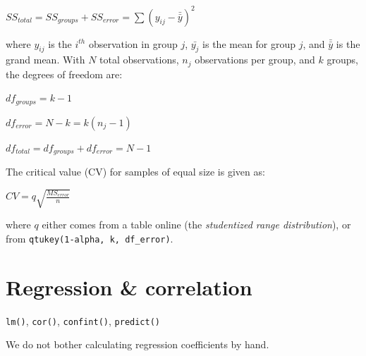 \documentclass[
  11pt,
  a4paper,
]{book}
\begin{document}
\({SS}_{total} = {SS}_{groups} + {SS}_{error} = \sum{(y_{ij} - \bar{\bar{y}})^2}\)

where \(y_{ij}\) is the \(i^{th}\) observation in group \(j\), \(\bar{y_j}\) is the mean for group \(j\), and \(\bar{\bar{y}}\) is the grand mean. With \(N\) total observations, \(n_j\) observations per group, and \(k\) groups, the degrees of freedom are:

\({df}_{groups} = k - 1\)

\({df}_{error} = N - k = k (n_j-1)\)

\({df}_{total} = {df}_{groups} + {df}_{error} = N-1\)

The critical value (CV) for samples of equal size is given as:

\(CV = q \sqrt{\frac{{MS}_{error}}{n}}\)

where \(q\) either comes from a table online (the \emph{studentized range distribution}), or from \texttt{qtukey(1-alpha,\ k,\ df\_error)}.

\hypertarget{regression-correlation}{%
\section{Regression \& correlation}\label{regression-correlation}}

\texttt{lm()}, \texttt{cor()}, \texttt{confint()}, \texttt{predict()}

We do not bother calculating regression coefficients by hand.
\end{document}
